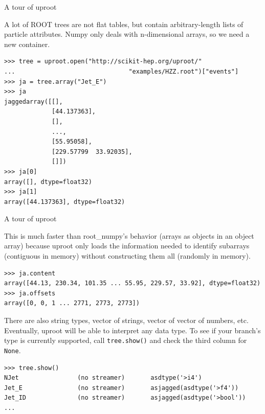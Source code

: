 \documentclass[aspectratio=169]{beamer}
\begin{document}
\begin{frame}[fragile]{A tour of uproot}
\vspace{0.4 cm}
\small

{\normalsize A lot of ROOT trees are not flat tables, but contain arbitrary-length lists of particle attributes. Numpy only deals with n-dimensional arrays, so we need a new container.}

\begin{verbatim}
>>> tree = uproot.open("http://scikit-hep.org/uproot/"
...                               "examples/HZZ.root")["events"]
>>> ja = tree.array("Jet_E")
>>> ja
jaggedarray([[],
             [44.137363],
             [],
             ...,
             [55.95058],
             [229.57799  33.92035],
             []])
>>> ja[0]
array([], dtype=float32)
>>> ja[1]
array([44.137363], dtype=float32)
\end{verbatim}
\end{frame}

\begin{frame}[fragile]{A tour of uproot}
\vspace{0.4 cm}
\small

{\normalsize This is much faster than root\_numpy's behavior (arrays as objects in an object array) because uproot only loads the information needed to identify subarrays (contiguous in memory) without constructing them all (randomly in memory).}

\begin{verbatim}
>>> ja.content
array([44.13, 230.34, 101.35 ... 55.95, 229.57, 33.92], dtype=float32)
>>> ja.offsets
array([0, 0, 1 ... 2771, 2773, 2773])
\end{verbatim}

\vspace{0.2 cm}
{\normalsize There are also string types, vector of strings, vector of vector of numbers, etc. Eventually, uproot will be able to interpret any data type. To see if your branch's type is currently supported, call {\tt\small tree.show()} and check the third column for {\tt\small None}.}

\begin{verbatim}
>>> tree.show()
NJet                (no streamer)       asdtype('>i4')
Jet_E               (no streamer)       asjagged(asdtype('>f4'))
Jet_ID              (no streamer)       asjagged(asdtype('>bool'))
...
\end{verbatim}
\end{frame}
\end{document}
